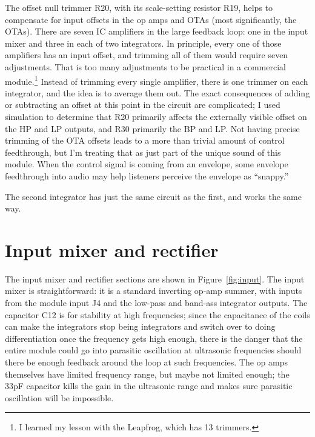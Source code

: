 The offset null trimmer R20, with its scale-setting resistor R19, helps to
compensate for input offsets in the op amps and OTAs (most significantly,
the OTAs).  There are seven IC amplifiers in the large feedback loop: one in
the input mixer and three in each of two integrators.  In principle, every
one of those amplifiers has an input offset, and trimming all of them would
require seven adjustments.  That is too many adjustments to be practical in
a commercial module.\footnote{I learned my lesson with the Leapfrog, which
has 13 trimmers.} Instead of trimming every single amplifier, there is one
trimmer on each integrator, and the idea is to average them out.  The exact
consequences of adding or subtracting an offset at this point in the circuit
are complicated; I used simulation to determine that R20 primarily affects
the externally visible offset on the HP and LP outputs, and R30 primarily
the BP and LP.  Not having precise trimming of the OTA offsets leads to a
more than trivial amount of control feedthrough, but I'm treating that as
just part of the unique sound of this module.  When the control signal is
coming from an envelope, some envelope feedthrough into audio may help
listeners perceive the envelope as ``snappy.''

The second integrator has just the same circuit as the first, and works the
same way.


\section{Input mixer and rectifier}

The input mixer and rectifier sections are shown in Figure~\ref{fig:input}. 
The input mixer is straightforward: it is a standard inverting op-amp
summer, with inputs from the module input J4 and the low-pass and band-ass
integrator outputs.  The capacitor C12 is for stability at high frequencies;
since the capacitance of the coils can make the integrators stop being
integrators and switch over to doing differentiation once the frequency gets
high enough, there is the danger that the entire module could go into
parasitic oscillation at ultrasonic frequencies should there be enough
feedback around the loop at such frequencies.  The op amps themselves have
limited frequency range, but maybe not limited enough; the 33pF capacitor
kills the gain in the ultrasonic range and makes sure parasitic oscillation
will be impossible.

